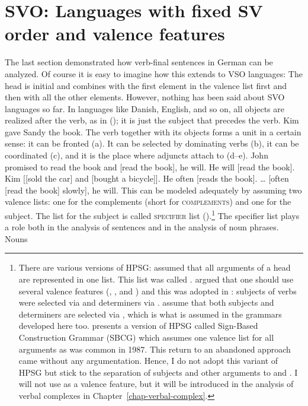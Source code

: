 
\section{SVO: Languages with fixed SV order and valence features}
\label{sec-intro-schemata}
\label{sec-intro-spr-comps}

The last section demonstrated how verb-final sentences in German can be analyzed. Of course it is
easy to imagine how this extends to VSO languages: The head is initial and combines with the first
element in the valence list first and then with all the other elements. However, nothing has been
said about SVO languages so far. In languages like Danish, English, and so on, all objects are
realized after the verb, as in (); it is just the subject that precedes the verb.
\ea
Kim gave Sandy the book.
\z
The verb together with its objects forms a unit in a certain sense: it can be fronted (a). It can be
selected by dominating verbs (b), it can be coordinated (c), and it is the place where adjuncts attach to (d--e).
\eal
\ex John promised to read the book and [read the book], he will.
\ex He will [read the book].
\ex Kim [[sold the car] and [bought a bicycle]]. 
\ex He often [reads the book].
\ex \ldots{} [often [read the book] slowly], he will.
\zl
This can be modeled adequately by assuming two valence lists: one for the complements (\comps short for \textsc{complements}) and
one for the subject. The list for the subject is called \textsc{specifier} list
(\spr).\footnote{%
  There are various versions of HPSG: \citet[Chapter~3.2]{ps} assumed that all arguments of a head are
  represented in one list. This list was called \subcatl. \citet{Borsley87a} argued that one should
  use several valence features (\subj, \spr, and \comps) and this was adopted in
  : subjects of verbs were selected via \subj and determiners via
  \spr. \citet*[Chapter~4.3]{SWB2003a} assume that both subjects and determiners are selected via \spr, which is
  what is assumed in the grammars developed here too. \citet[Section~3.3]{Sag2012a} presents a version of HPSG
  called Sign-Based Construction Grammar (SBCG) which assumes one valence list for all arguments as
  was common in 1987. This return to an abandoned approach came without any argumentation. Hence, I do not adopt this
  variant of HPSG but stick to the separation of subjects and other arguments to \spr and \comps. I
  will not use \subj as a valence feature, but it will be introduced in the analysis of verbal
  complexes in Chapter~\ref{chap-verbal-complex}.
} The specifier list plays a role both in the analysis of sentences and in the analysis of noun phrases. Nouns
